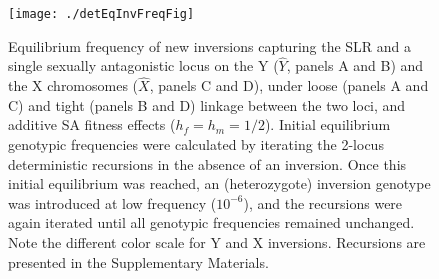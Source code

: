 \documentclass[11pt]{article}
\begin{document}
 \begin{figure}[!htbp]
 \centering
 \texttt{[image: ./detEqInvFreqFig]}
 \caption{Equilibrium frequency of new inversions capturing the SLR and a single sexually antagonistic locus on the Y ($\hat{Y}$, panels A and B) and the X chromosomes ($\hat{X}$, panels C and D), under loose (panels A and C) and tight (panels B and D) linkage between the two loci, and additive SA fitness effects ($h_f = h_m = 1/2$). Initial equilibrium genotypic frequencies were calculated by iterating the 2-locus deterministic recursions in the absence of an inversion. Once this initial equilibrium was reached, an (heterozygote) inversion genotype was introduced at low frequency ($10^{-6}$), and the recursions were again iterated until all genotypic frequencies remained unchanged. Note the different color scale for Y and X inversions. Recursions are presented in the Supplementary Materials.}
 \label{fig:detInvFreqSA}
 \end{figure}





\newpage

\end{document}
